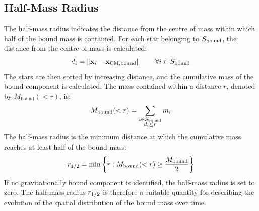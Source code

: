 \subsection{Half-Mass Radius}
\label{subsec:raggio-meta-massa}
The half-mass radius indicates the distance from the centre of mass within which half of the bound mass is contained. For each star belonging to $S_{\mathrm{bound}}$, the distance from the centre of mass is calculated:
\begin{equation}
	d_i =
	\left\|\mathbf{x}_i-\mathbf{x}_{\mathrm{CM,bound}}\right\|
	\qquad \forall i\in S_{\mathrm{bound}}
	\label{eq:stellar-distance}
\end{equation}
The stars are then sorted by increasing distance, and the cumulative mass of the bound component is calculated. The mass contained within a distance $r$, denoted by $M_{\mathrm{bound}}(<r)$, is:
\begin{equation}
	M_{\mathrm{bound}}(<r) = \sum_{\substack{i\in S_{\mathrm{bound}}\\d_i\leq r}}m_i
	\label{eq:cumulative-bound-mass}
\end{equation}
The half-mass radius is the minimum distance at which the cumulative mass reaches at least half of the bound mass:
\begin{equation}
	r_{1/2} = \min\left\{r : M_{\mathrm{bound}}(<r)\geq\frac{M_{\mathrm{bound}}}{2}\right\}
	\label{eq:half-mass-radius}
\end{equation}
If no gravitationally bound component is identified, the half-mass radius is set to zero.
The half-mass radius $r_{1/2}$ is therefore a suitable quantity for describing the evolution of the spatial distribution of the bound mass over time.%
